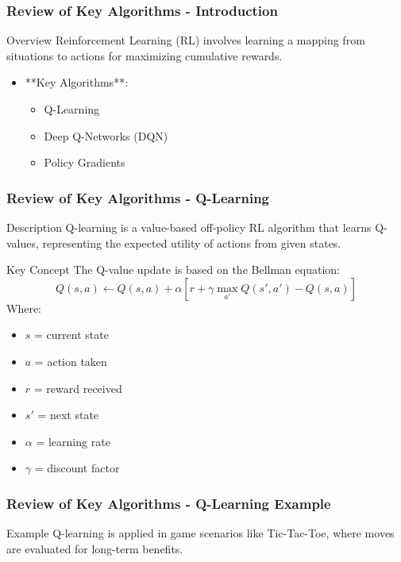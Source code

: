 \documentclass[aspectratio=169]{beamer}
\begin{document}
\begin{frame}[fragile]
    \frametitle{Review of Key Algorithms - Introduction}
    \begin{block}{Overview}
        Reinforcement Learning (RL) involves learning a mapping from situations to actions for maximizing cumulative rewards.
    \end{block}
    \begin{itemize}
        \item **Key Algorithms**:
        \begin{itemize}
            \item Q-Learning
            \item Deep Q-Networks (DQN)
            \item Policy Gradients
        \end{itemize}
    \end{itemize}
\end{frame}

\begin{frame}[fragile]
    \frametitle{Review of Key Algorithms - Q-Learning}
    \begin{block}{Description}
        Q-learning is a value-based off-policy RL algorithm that learns Q-values, representing the expected utility of actions from given states.
    \end{block}
    \begin{block}{Key Concept}
        The Q-value update is based on the Bellman equation:
        \begin{equation}
            Q(s, a) \leftarrow Q(s, a) + \alpha \left[ r + \gamma \max_{a'} Q(s', a') - Q(s, a) \right]
        \end{equation}
        Where:
        \begin{itemize}
            \item \(s\) = current state
            \item \(a\) = action taken
            \item \(r\) = reward received
            \item \(s'\) = next state
            \item \(\alpha\) = learning rate
            \item \(\gamma\) = discount factor
        \end{itemize}
    \end{block}
\end{frame}

\begin{frame}[fragile]
    \frametitle{Review of Key Algorithms - Q-Learning Example}
    \begin{block}{Example}
        Q-learning is applied in game scenarios like Tic-Tac-Toe, where moves are evaluated for long-term benefits.
    \end{block}
\end{frame}
\end{document}
